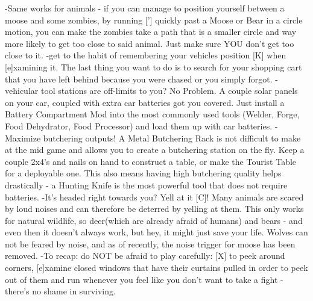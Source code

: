 \documentclass[11pt]{report}
\begin{document}
-Same works for animals - if you can manage to position yourself between a moose and some zombies, by running ['] quickly past a Moose or Bear in a circle motion, you can make the zombies take a path that is a smaller circle and way more likely to get too close to said animal. Just make sure YOU don't get too close to it.
-get to the habit of remembering your vehicles position [K] when [e]xamining it. The last thing you want to do is to search for your shopping cart that you have left behind because you were chased or you simply forgot.
-vehicular tool stations are off-limits to you? No Problem. A couple solar panels on your car, coupled with extra car batteries got you covered. Just install a Battery Compartment Mod into the most commonly used tools (Welder, Forge, Food Dehydrator, Food Processor) and load them up with car batteries.
-Maximize butchering outputs! A Metal Butchering Rack is not difficult to make at the mid game and allows you to create a butchering station on the fly. Keep a couple 2x4's and nails on hand to construct a table, or make the Tourist Table for a deployable one. This also means having high butchering quality helps drastically - a Hunting Knife is the most powerful tool that does not require batteries.
-It's headed right towards you? Yell at it [C]! Many animals are scared by loud noises and can therefore be deterred by yelling at them. This only works for natural wildlife, so deer(which are already afraid of humans) and bears - and even then it doesn't always work, but hey, it might just save your life. Wolves can not be feared by noise, and as of recently, the noise trigger for moose has been removed.
-To recap: do NOT be afraid to play carefully: [X] to peek around corners, [e]xamine closed windows that have their curtains pulled in order to peek out of them and run whenever you feel like you don't want to take a fight - there's no shame in surviving.
\end{document}
